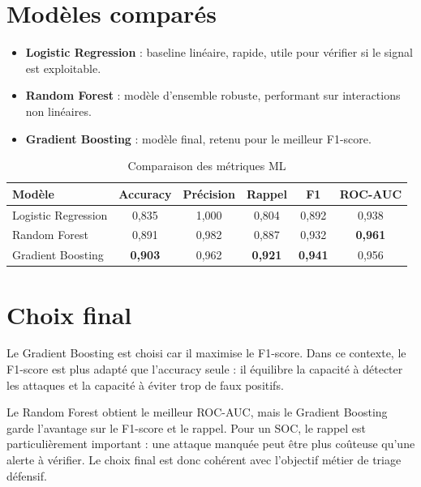 \section{Modèles comparés}
\begin{itemize}
  \item \textbf{Logistic Regression} : baseline linéaire, rapide, utile pour vérifier si le signal est exploitable.
  \item \textbf{Random Forest} : modèle d'ensemble robuste, performant sur interactions non linéaires.
  \item \textbf{Gradient Boosting} : modèle final, retenu pour le meilleur F1-score.
\end{itemize}


\begin{table}[H]
\centering
\caption{Comparaison des métriques ML}
\label{tab:model_metrics}
\begin{tabular}{@{}lccccc@{}}
\toprule
\textbf{Modèle} & \textbf{Accuracy} & \textbf{Précision} & \textbf{Rappel} & \textbf{F1} & \textbf{ROC-AUC}\\
\midrule
Logistic Regression & 0,835 & 1,000 & 0,804 & 0,892 & 0,938\\
Random Forest & 0,891 & 0,982 & 0,887 & 0,932 & \textbf{0,961}\\
Gradient Boosting & \textbf{0,903} & 0,962 & \textbf{0,921} & \textbf{0,941} & 0,956\\
\bottomrule
\end{tabular}
\end{table}

\section{Choix final}
Le Gradient Boosting est choisi car il maximise le F1-score. Dans ce contexte, le F1-score est plus adapté que l'accuracy seule : il équilibre la capacité à détecter les attaques et la capacité à éviter trop de faux positifs.

Le Random Forest obtient le meilleur ROC-AUC, mais le Gradient Boosting garde l'avantage sur le F1-score et le rappel. Pour un SOC, le rappel est particulièrement important : une attaque manquée peut être plus coûteuse qu'une alerte à vérifier. Le choix final est donc cohérent avec l'objectif métier de triage défensif.

